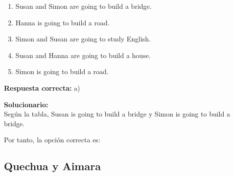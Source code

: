 \begin{enumerate}
\begin{center}
\end{center}

	\begin{enumerate}[label=\alph*)]
		\item Susan and Simon are going to build a bridge.
		\item Hanna is going to build a road.
		\item Simon and Susan are going to study English.
		\item Susan and Hanna are going to build a house.
		\item Simon is going to build a road.
	\end{enumerate}
	\textbf{Respuesta correcta:} a)
	
	\vspace{2mm}
	\textbf{Solucionario:}\\
	Según la tabla, Susan is going to build a bridge y Simon is going to build a bridge.
	
	Por tanto, la opción correcta es:
	
	
	\vspace{6mm}
	
\end{enumerate}

\subsection*{Quechua y Aimara}

